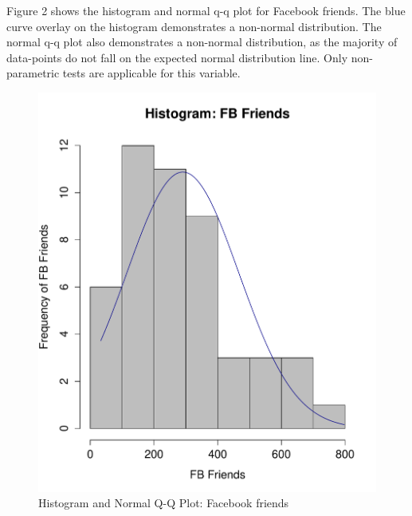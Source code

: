Figure 2 shows the histogram and normal q-q plot for Facebook friends. The blue curve overlay on the histogram demonstrates a non-normal distribution. The normal q-q plot also demonstrates a non-normal distribution, as the majority of data-points do not fall on the expected normal distribution line. Only non-parametric tests are applicable for this variable.

\begin{figure}[H]
\caption{Histogram and Normal Q-Q Plot: Facebook friends}
\centering
\includegraphics[scale=0.35]{./img/hist_fbfriends.pdf}

\end{figure}
